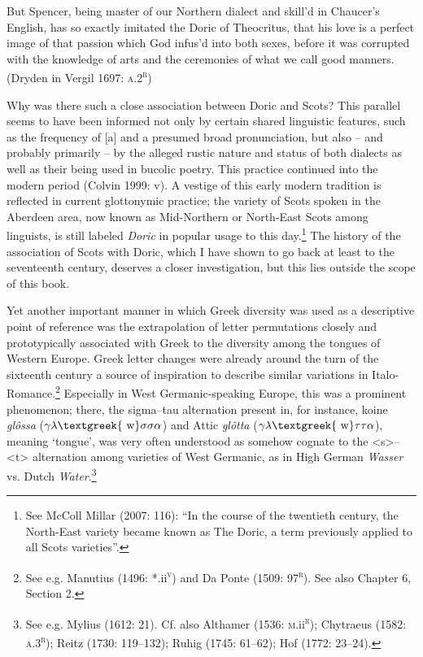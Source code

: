 \begin{styleQuote}
But Spencer, being master of our Northern dialect and skill’d in Chaucer’s English, has so exactly imitated the Doric of Theocritus, that his love is a perfect image of that passion which God infus’d into both sexes, before it was corrupted with the knowledge of arts and the ceremonies of what we call good manners. (Dryden in Vergil 1697: \textsc{a.2}\textsc{\textsuperscript{r}})
\end{styleQuote}

\begin{styleStandard}
Why was there such a close association between Doric and Scots? This parallel seems to have been informed not only by certain shared linguistic features, such as the frequency of [a] and a presumed broad pronunciation, but also – and probably primarily – by the alleged rustic nature and status of both dialects as well as their being used in bucolic poetry. This practice continued into the modern period (Colvin 1999: v). A vestige of this early modern tradition is reflected in current glottonymic practice; the variety of Scots spoken in the Aberdeen area, now known as Mid-Northern or North-East Scots among linguists, is still labeled \textit{Doric} in popular usage to this day.\footnote{ See McColl Millar (2007: 116): “In the course of the twentieth century, the North-East variety became known as The Doric, a term previously applied to all Scots varieties”.} The history of the association of Scots with Doric, which I have shown to go back at least to the seventeenth century, deserves a closer investigation, but this lies outside the scope of this book.
\end{styleStandard}

\begin{styleStandard}
Yet another important manner in which Greek diversity was used as a descriptive point of reference was the extrapolation of letter permutations closely and prototypically associated with Greek to the diversity among the tongues of Western Europe. Greek letter changes were already around the turn of the sixteenth century a source of inspiration to describe similar variations in Italo-Romance.\footnote{ See e.g. Manutius (1496: *.ii\textsc{\textsuperscript{v}}) and Da Ponte (1509: 97\textsc{\textsuperscript{r}}). See also Chapter 6, Section 2.} Especially in West Germanic-speaking Europe, this was a prominent phenomenon; there, the sigma–tau alternation present in, for instance, koine \textit{glôssa} ($\gamma \lambda \text{\textgreek{~w}}\sigma \sigma \alpha $) and Attic \textit{glôtta} ($\gamma \lambda \text{\textgreek{~w}}\tau \tau \alpha $), meaning ‘tongue’, was very often understood as somehow cognate to the {\textless}s{\textgreater}–{\textless}t{\textgreater} alternation among varieties of West Germanic, as in High German \textit{Wasser} vs. Dutch \textit{Water}.\footnote{ See e.g. Mylius (1612: 21). Cf. also Althamer (1536: \textsc{m}.ii\textsc{\textsuperscript{r}}); Chytraeus (1582: \textsc{a.3}\textsc{\textsuperscript{r}}); Reitz (1730: 119–132); Ruhig (1745: 61–62); Hof (1772: 23–24).}
\end{styleStandard}

